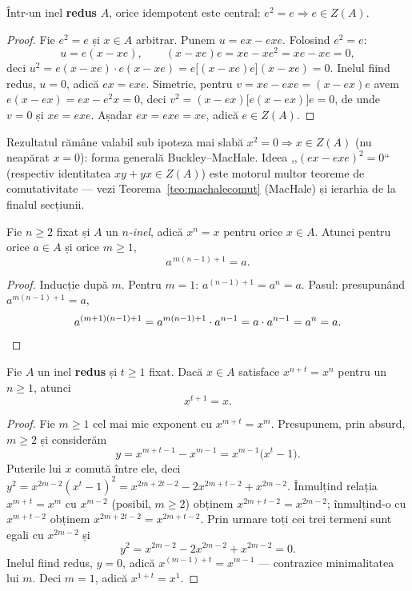 \begin{lema}\label{teo:machale}
Într-un inel \textbf{redus} $A$, orice idempotent este central: $e^2=e\Rightarrow e\in Z(A)$.
\end{lema}

\begin{proof}
Fie $e^2=e$ și $x\in A$ arbitrar. Punem $u=ex-exe$. Folosind $e^2=e$:
\[
u=e(x-xe),\qquad (x-xe)e=xe-xe^2=xe-xe=0,
\]
deci $u^2=e(x-xe)\cdot e(x-xe)=e\bigl[(x-xe)e\bigr](x-xe)=0$. Inelul fiind redus, $u=0$, adică $ex=exe$. Simetric, pentru $v=xe-exe=(x-ex)e$ avem $e(x-ex)=ex-e^2x=0$, deci $v^2=(x-ex)\bigl[e(x-ex)\bigr]e=0$, de unde $v=0$ și $xe=exe$. Așadar $ex=exe=xe$, adică $e\in Z(A)$.
\end{proof}

\begin{observatie}
Rezultatul rămâne valabil sub ipoteza mai slabă $x^2=0\Rightarrow x\in Z(A)$ (nu neapărat $x=0$): forma generală Buckley--MacHale. Ideea ,,$(ex-exe)^2=0$`` (respectiv identitatea $xy+yx\in Z(A)$) este motorul multor teoreme de comutativitate --- vezi Teorema~\ref{teo:machalecomut} (MacHale) și ierarhia de la finalul secțiunii.
\end{observatie}

\begin{lema}\label{lema:ninel}
Fie $n\ge2$ fixat și $A$ un \emph{$n$-inel}, adică $x^n=x$ pentru orice $x\in A$. Atunci pentru orice $a\in A$ și orice $m\ge1$,
\[
a^{\,m(n-1)+1}=a.
\]
\end{lema}

\begin{proof}
Inducție după $m$. Pentru $m=1$: $a^{(n-1)+1}=a^n=a$. Pasul: presupunând $a^{m(n-1)+1}=a$,
\[
a^{(m+1)(n-1)+1}=a^{m(n-1)+1}\cdot a^{n-1}=a\cdot a^{n-1}=a^n=a.\qedhere
\]
\end{proof}

\begin{propozitie}\label{prop:redus}
Fie $A$ un inel \textbf{redus} și $t\ge1$ fixat. Dacă $x\in A$ satisface $x^{n+t}=x^n$ pentru un $n\ge1$, atunci
\[
x^{t+1}=x.
\]
\end{propozitie}

\begin{proof}
Fie $m\ge1$ cel mai mic exponent cu $x^{m+t}=x^m$. Presupunem, prin absurd, $m\ge2$ și considerăm
\[
y=x^{m+t-1}-x^{m-1}=x^{m-1}\bigl(x^{t}-1\bigr).
\]
Puterile lui $x$ comută între ele, deci $y^2=x^{2m-2}(x^t-1)^2=x^{2m+2t-2}-2x^{2m+t-2}+x^{2m-2}$. Înmulțind relația $x^{m+t}=x^m$ cu $x^{m-2}$ (posibil, $m\ge2$) obținem $x^{2m+t-2}=x^{2m-2}$; înmulțind-o cu $x^{m+t-2}$ obținem $x^{2m+2t-2}=x^{2m+t-2}$. Prin urmare toți cei trei termeni sunt egali cu $x^{2m-2}$ și
\[
y^2=x^{2m-2}-2x^{2m-2}+x^{2m-2}=0.
\]
Inelul fiind redus, $y=0$, adică $x^{(m-1)+t}=x^{m-1}$ --- contrazice minimalitatea lui $m$. Deci $m=1$, adică $x^{1+t}=x^1$.
\end{proof}

